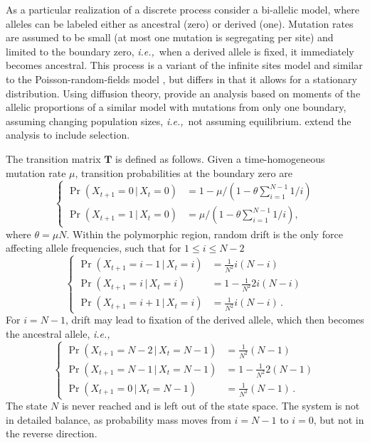 \documentclass[preprint]{elsarticle}
\newcommand\given{{\,|\,}}
\newcommand\ie{{\it i.e.,}}
\newcommand\x[1]{\ensuremath{X_{#1}}}
\begin{document}
As a particular realization of a discrete process consider a bi-allelic model, where alleles can be labeled either as ancestral (zero) or derived (one). Mutation rates are assumed to be small (at most one mutation is segregating per site) and limited to the boundary zero, \ie\ when a derived allele is fixed, it immediately becomes ancestral. This process is a variant of the infinite sites model \citep{Kimu69} and similar to the Poisson-random-fields model \citep{Sawy92}, but differs in that it allows for a stationary distribution. Using diffusion theory, \citet{Evan07} provide an analysis based on moments of the allelic proportions of a similar model with mutations from only one boundary, assuming changing population sizes, \ie\ not assuming equilibrium. \citet{Zivk15} extend the analysis to include selection. 

The transition matrix $\mathbf{T}$ is defined as follows. Given a time-homogeneous mutation rate $\mu$, transition probabilities at the boundary zero are
\begin{equation}\label{eq:boundary_mutation}
\begin{cases}
\Pr(\x{t+1}=0\given \x{t}=0)&=1-\mu/(1-\theta\sum_{i=1}^{N-1}1/i)\\
\Pr(\x{t+1}=1\given \x{t}=0)&=\mu/(1-\theta\sum_{i=1}^{N-1}1/i),
\end{cases}
\end{equation}
where $\theta=\mu N$. Within the polymorphic region, random drift is the only force affecting allele frequencies, such that for $1\leq i \leq N-2$
\begin{equation}
\begin{cases}
\Pr(\x{t+1}=i-1\given \x{t}=i) &=\frac1{N^2} i(N-i)\\
\Pr(\x{t+1}=i\given \x{t}=i)   &=1-\frac1{N^2} 2i(N-i)\\
\Pr(\x{t+1}=i+1\given \x{t}=i) &=\frac1{N^2} i(N-i)\,.
\end{cases}
\end{equation}
For $i=N-1$, drift may lead to fixation of the derived allele, which then becomes the ancestral allele, \ie\
\begin{equation}
\begin{cases}
\Pr(\x{t+1}=N-2\given \x{t}=N-1) &=\frac1{N^2} (N-1)\\
\Pr(\x{t+1}=N-1\given \x{t}=N-1) &=1-\frac1{N^2} 2(N-1)\\
\Pr(\x{t+1}=0\given \x{t}=N-1)   &=\frac1{N^2} (N-1)\,.
\end{cases}
\end{equation}
The state $N$ is never reached and is left out of the state space. The system is not in detailed balance, as probability mass moves from $i=N-1$ to $i=0$, but not in the reverse direction.
\end{document}
